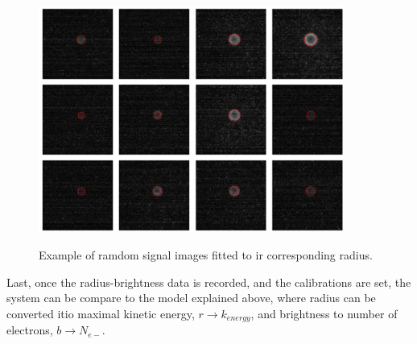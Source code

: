 \begin{figure}[hbtp]
\caption{Example of ramdom signal images fitted to ir corresponding radius.}
\centering
\includegraphics[width=10cm]{../Images/density_plot_chekc.png}
\label{fig:checkradius}
\end{figure}
Last, once the radius-brightness data is recorded, and the calibrations are set, the system can be compare to the model explained above, where radius can be converted itio maximal kinetic energy, $r\rightarrow k_{energy}$, and brightness to number of electrons, $b\rightarrow N_{e-}$. 

